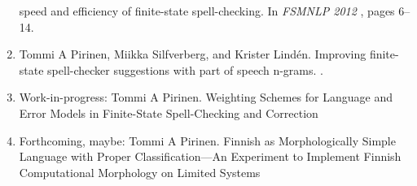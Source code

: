 \documentclass[officiallayout,draft]{unihelcompling}
\begin{document}
\begin{enumerate}
        speed and efficiency of finite-state spell-checking.
        \newblock In {\em FSMNLP 2012\/} \cite{fsmnlp2012}, pages 6--14.
    \item \cite{pirinen2012improving}
        Tommi A Pirinen, Miikka Silfverberg, and Krister Lind\'{e}n.
        \newblock Improving finite-state spell-checker suggestions with part of
        speech n-grams.
        .
    \item Work-in-progress: 
        Tommi A Pirinen.
        \newblock Weighting Schemes for Language and Error Models in
        Finite-State Spell-Checking and Correction
    \item Forthcoming, maybe:
        Tommi A Pirinen.
        \newblock Finnish as Morphologically Simple Language with Proper
        Classification---An Experiment to Implement Finnish Computational
        Morphology on Limited Systems
\end{enumerate}
\end{document}
